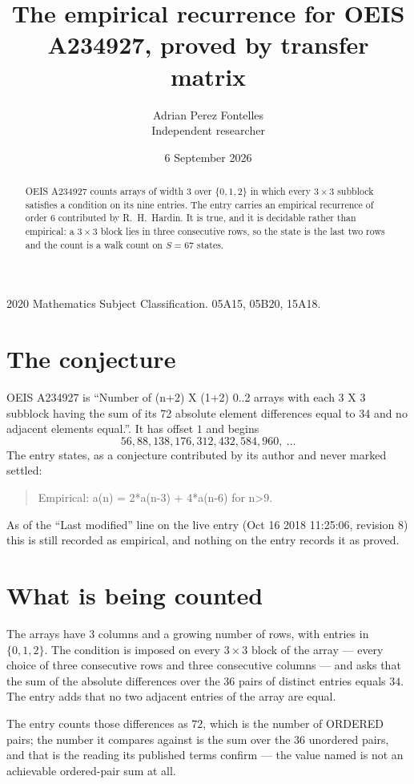 \documentclass[11pt,a4paper]{article}
\title{The empirical recurrence for OEIS A234927, proved by transfer matrix}
\author{Adrian Perez Fontelles\\ \small Independent researcher}
\date{6 September 2026}
\theoremstyle{plain}
\theoremstyle{definition}
\begin{document}
\maketitle

\begin{abstract}
OEIS A234927 counts arrays of width $3$ over $\{0,1,2\}$ in which every $3\times3$ subblock
satisfies a condition on its nine entries. The entry carries an empirical recurrence of order
$6$ contributed by R.~H.~Hardin. It is true, and it is decidable rather than empirical: a
$3\times3$ block lies in three consecutive rows, so the state is the last two rows and the
count is a walk count on $S=67$ states.
\end{abstract}

\noindent\small 2020 Mathematics Subject Classification. 05A15, 05B20, 15A18.\normalsize

\section{The conjecture}

OEIS A234927 is ``Number of (n+2) X (1+2) 0..2 arrays with each 3 X 3 subblock having the sum of its 72 absolute element differences equal to 34 and no adjacent elements equal.''. It has offset $1$ and begins
\[
56, 88, 138, 176, 312, 432, 584, 960,\ \dots
\]
The entry states, as a conjecture contributed by its author and never marked settled:
\begin{quote}
Empirical: a(n) = 2*a(n-3) + 4*a(n-6) for n>9.
\end{quote}
As of the ``Last modified'' line on the live entry (Oct 16 2018 11:25:06, revision 8) this is still
recorded as empirical, and nothing on the entry records it as proved.

\section{What is being counted}

The arrays have $3$ columns and a growing number of rows, with entries in $\{0,1,2\}$. The
condition is imposed on every $3\times3$ block of the array --- every choice of three
consecutive rows and three consecutive columns --- and asks that the sum of the absolute differences over the $36$ pairs of distinct entries equals $34$. The entry adds that no two adjacent entries of the array are equal.

The entry counts those differences as $72$, which is the number of ORDERED pairs; the number it compares against is the sum over the $36$ unordered pairs, and that is the reading its published terms confirm --- the value named is not an achievable ordered-pair sum at all.
\end{document}
